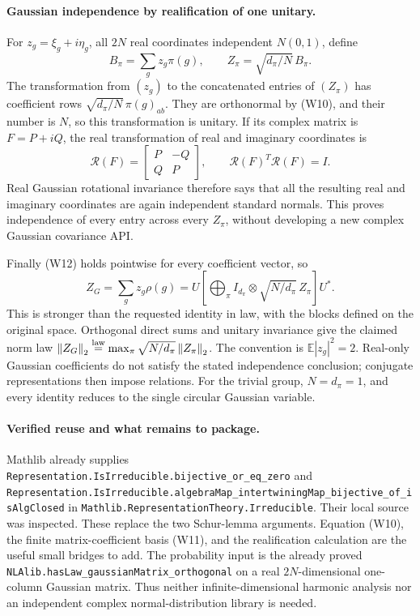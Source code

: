 \documentclass[11pt,a4paper]{article}
\newcommand{\norm}[1]{\left\lVert#1\right\rVert}
\DeclareRobustCommand{\code}[1]{{\footnotesize\urlstyle{tt}\nolinkurl{#1}}}
\begin{document}
\paragraph{Gaussian independence by realification of one unitary.}
For $z_g=\xi_g+i\eta_g$, all $2N$ real coordinates independent $N(0,1)$,
define
\[
 B_\pi=\sum_gz_g\pi(g),\qquad Z_\pi=\sqrt{d_\pi/N}\,B_\pi.
\]
The transformation from $(z_g)$ to the concatenated entries of $(Z_\pi)$
has coefficient rows $\sqrt{d_\pi/N}\,\pi(g)_{ab}$. They are orthonormal
by (W10), and their number is $N$, so this transformation is unitary.
If its complex matrix is $F=P+iQ$, the real transformation of real and
imaginary coordinates is
\[
 \mathcal R(F)=\begin{bmatrix}P&-Q\\Q&P\end{bmatrix},\qquad
 \mathcal R(F)^T\mathcal R(F)=I.
\]
Real Gaussian rotational invariance therefore says that all the resulting
real and imaginary coordinates are again independent standard normals.
This proves independence of every entry across every $Z_\pi$, without
developing a new complex Gaussian covariance API.

Finally (W12) holds pointwise for every coefficient vector, so
\[
 Z_G=\sum_gz_g\rho(g)
 =U\left[\bigoplus_\pi I_{d_\pi}\otimes
                   \sqrt{N/d_\pi}\,Z_\pi\right]U^*.
\]
This is stronger than the requested identity in law, with the blocks
defined on the original space. Orthogonal direct sums and unitary invariance
give the claimed norm law
$\norm{Z_G}_2\overset{\rm law}=\max_\pi\sqrt{N/d_\pi}\norm{Z_\pi}_2$.
The convention is $\mathbb E|z_g|^2=2$. Real-only Gaussian coefficients do
not satisfy the stated independence conclusion; conjugate representations
then impose relations. For the trivial group, $N=d_\pi=1$, and every
identity reduces to the single circular Gaussian variable.

\paragraph{Verified reuse and what remains to package.}
Mathlib already supplies
\code{Representation.IsIrreducible.bijective_or_eq_zero} and
\code{Representation.IsIrreducible.algebraMap_intertwiningMap_bijective_of_isAlgClosed}
in \code{Mathlib.RepresentationTheory.Irreducible}.
Their local source was inspected. These replace the two Schur-lemma
arguments. Equation (W10), the finite matrix-coefficient basis (W11),
and the realification calculation are the useful small bridges to add.
The probability input is the already proved
\code{NLAlib.hasLaw_gaussianMatrix_orthogonal} on a real $2N$-dimensional
one-column Gaussian matrix. Thus neither infinite-dimensional harmonic
analysis nor an independent complex normal-distribution library is needed.
\end{document}
